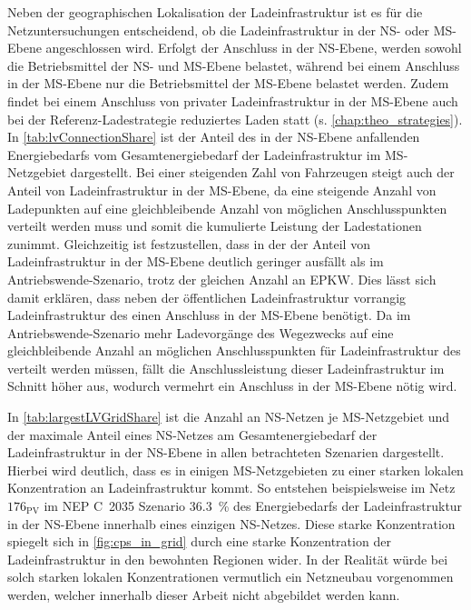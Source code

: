 Neben der geographischen Lokalisation der Ladeinfrastruktur ist es für die Netzuntersuchungen entscheidend, ob die Ladeinfrastruktur in der \gls{NS}- oder \gls{MS}-Ebene angeschlossen wird.
Erfolgt der Anschluss in der \gls{NS}-Ebene, werden sowohl die Betriebsmittel der \gls{NS}- und \gls{MS}-Ebene belastet, während bei einem Anschluss in der \gls{MS}-Ebene nur die Betriebsmittel der \gls{MS}-Ebene belastet werden.
Zudem findet bei einem Anschluss von privater Ladeinfrastruktur in der \gls{MS}-Ebene auch bei der Referenz-Ladestrategie reduziertes Laden statt (s. \autoref{chap:theo_strategies}).
In \autoref{tab:lvConnectionShare} ist der Anteil des in der \gls{NS}-Ebene anfallenden Energiebedarfs vom Gesamtenergiebedarf der Ladeinfrastruktur im \gls{MS}-Netzgebiet dargestellt.
Bei einer steigenden Zahl von Fahrzeugen steigt auch der Anteil von Ladeinfrastruktur in der \gls{MS}-Ebene, da eine steigende Anzahl von Ladepunkten auf eine gleichbleibende Anzahl von möglichen Anschlusspunkten verteilt werden muss und somit die kumulierte Leistung der Ladestationen zunimmt.
Gleichzeitig ist festzustellen, dass in der \SzeFirmenparkplatz der Anteil von Ladeinfrastruktur in der \gls{MS}-Ebene deutlich geringer ausfällt als im Antriebswende-Szenario, trotz der gleichen Anzahl an \gls{EPKW}.
Dies lässt sich damit erklären, dass neben der öffentlichen Ladeinfrastruktur vorrangig Ladeinfrastruktur des \UC \Firmeparkplatz einen Anschluss in der \gls{MS}-Ebene benötigt.
Da im Antriebswende-Szenario mehr Ladevorgänge des Wegezwecks \Arbeit auf eine gleichbleibende Anzahl an möglichen Anschlusspunkten für Ladeinfrastruktur des \UC \Firmeparkplatz verteilt werden müssen, fällt die Anschlussleistung dieser Ladeinfrastruktur im Schnitt höher aus, wodurch vermehrt ein Anschluss in der \gls{MS}-Ebene nötig wird.



In \autoref{tab:largestLVGridShare} ist die Anzahl an \gls{NS}-Netzen je \gls{MS}-Netzgebiet und der maximale Anteil eines \gls{NS}-Netzes am Gesamtenergiebedarf der Ladeinfrastruktur in der \gls{NS}-Ebene in allen betrachteten Szenarien dargestellt.
Hierbei wird deutlich, dass es in einigen \gls{MS}-Netzgebieten zu einer starken lokalen Konzentration an Ladeinfrastruktur kommt.
So entstehen beispielsweise im Netz \(176_{\text{PV}}\) im \gls{NEP} C~\num{2035} Szenario \SI{36.3}{\percent} des Energiebedarfs der Ladeinfrastruktur in der \gls{NS}-Ebene innerhalb eines einzigen \gls{NS}-Netzes.
Diese starke Konzentration spiegelt sich in \autoref{fig:cps_in_grid} durch eine starke Konzentration der Ladeinfrastruktur in den bewohnten Regionen wider.
In der Realität würde bei solch starken lokalen Konzentrationen vermutlich ein Netzneubau vorgenommen werden, welcher innerhalb dieser Arbeit nicht abgebildet werden kann.

